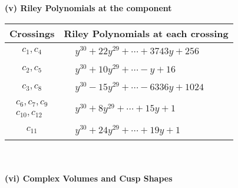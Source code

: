 \documentclass[1p]{elsarticle_modified}
\theoremstyle{definition}
\begin{document}
\newpage\renewcommand{\arraystretch}{1}
\flushleft \textbf{(v) Riley Polynomials at the component}\newline \\
\begin{tabular}{m{50pt}|m{274pt}}
Crossings & \hspace{64pt}Riley Polynomials at each crossing \\
\hline $$\begin{aligned}c_{1},c_{4}\end{aligned}$$&$\begin{aligned}
&y^{30}+22 y^{29}+\cdots+3743 y+256
\end{aligned}$\\
\hline $$\begin{aligned}c_{2},c_{5}\end{aligned}$$&$\begin{aligned}
&y^{30}+10 y^{29}+\cdots- y+16
\end{aligned}$\\
\hline $$\begin{aligned}c_{3},c_{8}\end{aligned}$$&$\begin{aligned}
&y^{30}-15 y^{29}+\cdots-6336 y+1024
\end{aligned}$\\
\hline $$\begin{aligned}c_{6},c_{7},c_{9}\\c_{10},c_{12}\end{aligned}$$&$\begin{aligned}
&y^{30}+8 y^{29}+\cdots+15 y+1
\end{aligned}$\\
\hline $$\begin{aligned}c_{11}\end{aligned}$$&$\begin{aligned}
&y^{30}+24 y^{29}+\cdots+19 y+1
\end{aligned}$\\
\hline
\end{tabular}\\~\\
\newpage\flushleft \textbf{(vi) Complex Volumes and Cusp Shapes}
\end{document}
